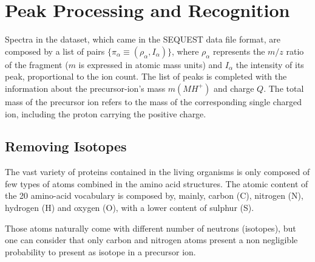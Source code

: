 \section{Peak Processing and Recognition}

Spectra in the dataset, which came in the SEQUEST data file format, are composed
by a list of pairs
$\{\pi_\alpha\equiv(\rho_\alpha,I_\alpha)\}$, where $\rho_\alpha$ represents the
$m/z$ ratio of the fragment ($m$ is expressed in atomic mass units) and $I_\alpha$ the
intensity of its peak, proportional to the ion count.
The list of peaks is completed with the information about the precursor-ion's mass $m(MH^+)$ and charge $Q$. The total mass of the precursor
ion refers to the mass of the corresponding single charged ion, including the
proton carrying the positive charge.


%

\subsection{Removing Isotopes}

The vast variety of proteins contained in the living organisms is only composed
of few types of atoms combined in  the amino acid structures. The atomic content
of the 20 amino-acid vocabulary 
is composed by, mainly,
carbon (C), nitrogen (N), hydrogen (H) and oxygen (O), with a  lower
content of sulphur (S).

Those atoms naturally come with different number of neutrons (isotopes), but one can consider that
only carbon and nitrogen atoms present a non negligible probability to present
as isotope in a precursor ion.

